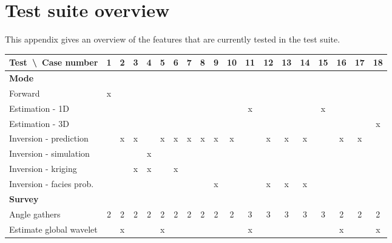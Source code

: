 \chapter{Test suite overview}
\label{sec:test-suite-overview}

This appendix gives an overview of the features that are currently
tested in the test suite.

\newcommand{\mc}[1]{\multicolumn{19}{|l|}{\textbf{#1}}}



\small
\begin{tabular}{|l|c|c|c|c|c|c|c|c|c|c|c|c|c|c|c|c|c|c|}\hline
Test\ \textbackslash\ Case number    & 1 & 2 & 3 & 4 & 5 & 6 & 7 & 8 & 9 &10 &11 &12 &13 &14 &15 &16 &17 &18 \\ \hline
\mc{Mode}\\ \hline
\quad Forward                        & x &   &   &   &   &   &   &   &   &   &   &   &   &   &   &   &   &   \\ \hline
\quad Estimation - 1D                &   &   &   &   &   &   &   &   &   &   & x &   &   &   & x &   &   &   \\ \hline
\quad Estimation - 3D                &   &   &   &   &   &   &   &   &   &   &   &   &   &   &   &   &   & x \\ \hline
\quad Inversion - prediction         &   & x & x &   & x & x & x & x & x & x &   & x & x & x &   & x & x &   \\ \hline
\quad Inversion - simulation         &   &   &   & x &   &   &   &   &   &   &   &   &   &   &   &   &   &   \\ \hline
\quad Inversion - kriging            &   &   & x & x &   & x &   &   &   &   &   &   &   &   &   &   &   &   \\ \hline
\quad Inversion - facies prob.       &   &   &   &   &   &   &   &   & x &   &   & x & x & x &   &   &   &   \\ \hline
\mc{Survey}\\ \hline
\quad Angle gathers                  & 2 & 2 & 2 & 2 & 2 & 2 & 2 & 2 & 2 & 2 & 3 & 3 & 3 & 3 & 3 & 2 & 2 & 2 \\ \hline
\quad Estimate global wavelet        &   & x &   &   & x &   &   &   &   &   & x &   &   &   &   & x &   & x \\ \hline

\end{tabular}
